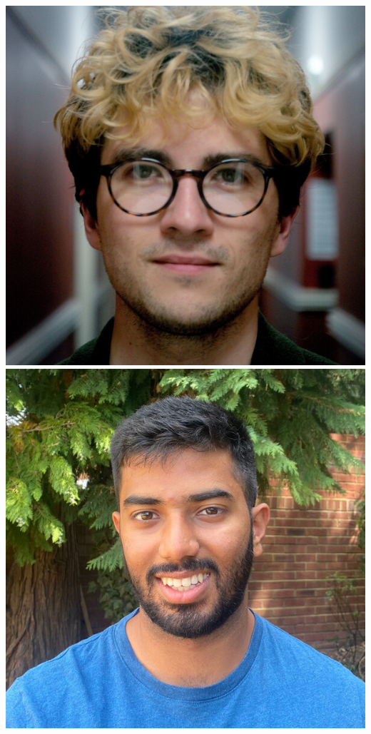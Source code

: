 \documentclass[aspectratio=169]{beamer}
\begin{document}
\begin{frame}
{        \includegraphics[width=0.09\textheight]{people/harvey_williams.jpg}%
        \includegraphics[width=0.09\textheight]{people/krish_nanavati.jpg}%
}
\end{frame}
\end{document}
